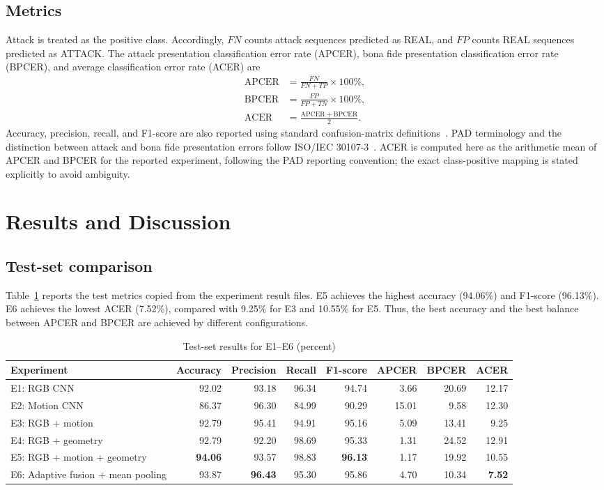 \documentclass[a4paper,conference]{IEEEtran}
\begin{document}
\subsection{Metrics}
Attack is treated as the positive class. Accordingly, $FN$ counts attack sequences predicted as REAL, and $FP$ counts REAL sequences predicted as ATTACK. The attack presentation classification error rate (APCER), bona fide presentation classification error rate (BPCER), and average classification error rate (ACER) are
\begin{align}
\mathrm{APCER} &= \frac{FN}{FN+TP}\times100\%,\\
\mathrm{BPCER} &= \frac{FP}{FP+TN}\times100\%,\\
\mathrm{ACER} &= \frac{\mathrm{APCER}+\mathrm{BPCER}}{2}.
\end{align}
Accuracy, precision, recall, and F1-score are also reported using standard confusion-matrix definitions~\cite{sokolova2009}. PAD terminology and the distinction between attack and bona fide presentation errors follow ISO/IEC 30107-3~\cite{iso30107}. ACER is computed here as the arithmetic mean of APCER and BPCER for the reported experiment, following the PAD reporting convention; the exact class-positive mapping is stated explicitly to avoid ambiguity.

\section{Results and Discussion}
\subsection{Test-set comparison}
Table~\ref{tab:results} reports the test metrics copied from the experiment result files. E5 achieves the highest accuracy (94.06\%) and F1-score (96.13\%). E6 achieves the lowest ACER (7.52\%), compared with 9.25\% for E3 and 10.55\% for E5. Thus, the best accuracy and the best balance between APCER and BPCER are achieved by different configurations.

\begin{table}[t]
\caption{Test-set results for E1--E6 (percent)}
\label{tab:results}
\centering\footnotesize
\begin{tabular}{lrrrrrrr}
\toprule
Experiment & Accuracy & Precision & Recall & F1-score & APCER & BPCER & ACER \\
\midrule
E1: RGB CNN & 92.02 & 93.18 & 96.34 & 94.74 & 3.66 & 20.69 & 12.17 \\
E2: Motion CNN & 86.37 & 96.30 & 84.99 & 90.29 & 15.01 & 9.58 & 12.30 \\
E3: RGB + motion & 92.79 & 95.41 & 94.91 & 95.16 & 5.09 & 13.41 & 9.25 \\
E4: RGB + geometry & 92.79 & 92.20 & 98.69 & 95.33 & 1.31 & 24.52 & 12.91 \\
E5: RGB + motion + geometry & \textbf{94.06} & 93.57 & 98.83 & \textbf{96.13} & 1.17 & 19.92 & 10.55 \\
E6: Adaptive fusion + mean pooling & 93.87 & \textbf{96.43} & 95.30 & 95.86 & 4.70 & 10.34 & \textbf{7.52} \\
\bottomrule
\end{tabular}
\end{table}
\end{document}
